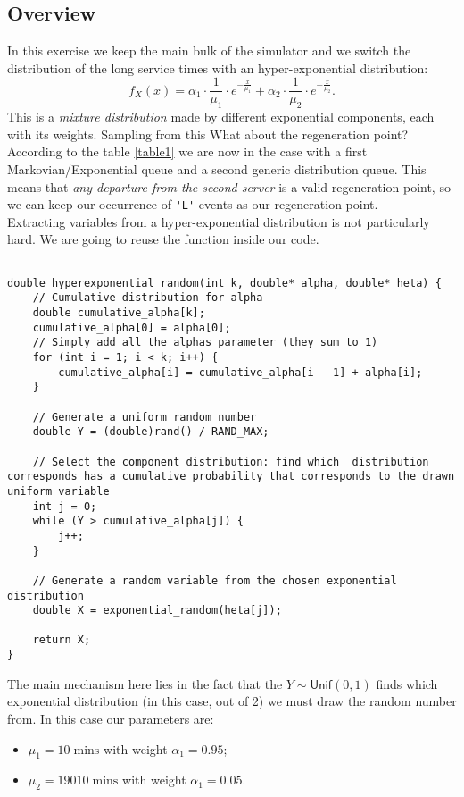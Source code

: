 \documentclass[12pt]{article}
\begin{document}
\subsection{Overview}
In this exercise we keep the main bulk of the simulator and we switch the distribution of the long service times with an hyper-exponential distribution:
\begin{equation*}
	f_{X}(x) = \alpha_1\cdot\frac{1}{\mu_1}\cdot e^{-\frac{x}{\mu_1}}+\alpha_2\cdot\frac{1}{\mu_2}\cdot e^{-\frac{x}{\mu_2}}.
\end{equation*}
This is a \textit{mixture distribution} made by different exponential components, each with its weights. 
Sampling from this 
What about the regeneration point? According to the table \ref{table1} we are now in the case with a first Markovian/Exponential queue and a second generic distribution queue. This means that \textit{any departure from the second server} is a valid regeneration point, so we can keep our occurrence of \verb*|'L'| events as our regeneration point. \\
Extracting variables from a hyper-exponential distribution is not particularly hard. We are going to reuse the  function inside our code.
\begin{lstlisting}

double hyperexponential_random(int k, double* alpha, double* heta) {
	// Cumulative distribution for alpha
	double cumulative_alpha[k];
	cumulative_alpha[0] = alpha[0];
	// Simply add all the alphas parameter (they sum to 1)
	for (int i = 1; i < k; i++) {
		cumulative_alpha[i] = cumulative_alpha[i - 1] + alpha[i];
	}
	
	// Generate a uniform random number
	double Y = (double)rand() / RAND_MAX;
	
	// Select the component distribution: find which  distribution corresponds has a cumulative probability that corresponds to the drawn uniform variable
	int j = 0;
	while (Y > cumulative_alpha[j]) {
		j++;
	}
	
	// Generate a random variable from the chosen exponential distribution
	double X = exponential_random(heta[j]);
	
	return X;
}

\end{lstlisting}
The main mechanism here lies in the fact that the \rv{} $Y\sim\mathsf{Unif}(0,1)$ finds which exponential distribution (in this case, out of 2) we must draw the random number from. In this case our parameters are:
\begin{itemize}
	\item $\mu_1=10\;\mathrm{mins}$ with weight $\alpha_1=0.95$;
	\item $\mu_2=19010\;\mathrm{mins}$ with weight $\alpha_1=0.05$.
\end{itemize}
\end{document}
